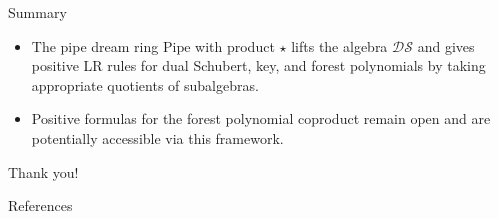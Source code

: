 \documentclass[aspectratio=169]{beamer}
\newcommand{\dcoma}{\mathcal{DS}}
\newcommand{\RC}{\mathrm{Pipe}}
\begin{document}
\begin{frame}{Summary}
  \begin{itemize}
    \item The pipe dream ring $\RC$ with product $\star$ lifts the algebra $\dcoma$ and gives positive LR rules for dual Schubert, key, and forest polynomials by taking appropriate quotients of subalgebras.
    \item Positive formulas for the forest polynomial coproduct remain open and are potentially accessible via this framework.
  \end{itemize}
  \vspace{0.5em}
  \centering Thank you!
\end{frame}

\begin{frame}[allowframebreaks]{References}
  
  
\end{frame}
\end{document}
